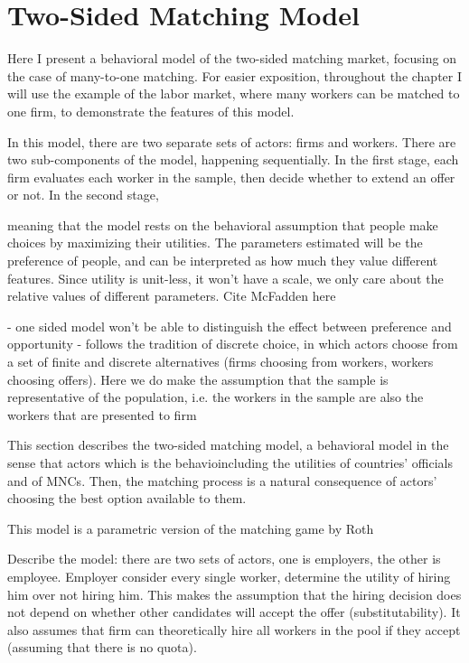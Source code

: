 \chapter{Two-Sided Matching Model}
\label{chap:model}

Here I present a behavioral model of the two-sided matching market, focusing on
the case of many-to-one matching. For easier exposition, throughout the chapter
I will use the example of the labor market, where many workers can be matched to
one firm, to demonstrate the features of this model.

In this model, there are two separate sets of actors: firms and workers. There
are two sub-components of the model, happening sequentially. In the first stage, each firm
evaluates each worker in the sample, then decide whether to extend an offer or
not. In the second stage, 

meaning that the model rests on the behavioral assumption that
people make choices by maximizing their utilities. The parameters estimated will
be the preference of people, and can be interpreted as how much they value
different features. Since utility is unit-less, it won't have a scale, we only
care about the relative values of different parameters.
Cite McFadden here

- one sided model won't be able to distinguish the effect between preference and opportunity
- follows the tradition of discrete choice, in which actors choose from a set of
finite and discrete alternatives (firms choosing from workers, workers choosing
offers). Here we do make the assumption that the sample is representative of the
population, i.e. the workers in the sample are also the workers that are
presented to firm

This section describes the two-sided matching model, a behavioral model in the
sense that actors which is the
behavioincluding the utilities of countries' officials and of MNCs. Then, the matching process is a natural consequence of actors' choosing the best option available to them.

This model is a parametric version of the matching game by Roth 

Describe the model: there are two sets of actors, one is employers, the other is
employee. Employer consider every single worker, determine the utility of hiring
him over not hiring him. This makes the assumption that the hiring decision does
not depend on whether other candidates will accept the offer (substitutability).
It also assumes that firm can theoretically hire all workers in the pool if they
accept (assuming that there is no quota).

